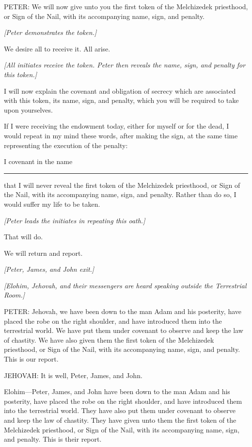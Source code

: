 				PETER: We will now give unto you the first token of the Melchizedek priesthood, or Sign of the Nail, with its accompanying name, sign, and penalty.

				\textit{[Peter demonstrates the token.]}

				We desire all to receive it. All arise.

				\textit{[All initiates receive the token. Peter then reveals the name, sign, and penalty for this token.]}

				I will now explain the covenant and obligation of secrecy which are associated with this token, its name, sign, and penalty, which you will be required to take upon yourselves.

				If I were receiving the endowment today, either for myself or for the dead, I would repeat in my mind these words, after making the sign, at the same time representing the execution of the penalty:

				I covenant in the name \rule{1cm}{0.15mm} that I will never reveal the first token of the Melchizedek priesthood, or Sign of the Nail, with its accompanying name, sign, and penalty. Rather than do so, I would suffer my life to be taken.
				
				\textit{[Peter leads the initiates in repeating this oath.]}

				That will do.

				We will return and report.

				\textit{[Peter, James, and John exit.]}
				
				\textit{[Elohim, Jehovah, and their messengers are heard speaking outside the Terrestrial Room.]}

				PETER: Jehovah, we have been down to the man Adam and his posterity, have placed the robe on the right shoulder, and have introduced them into the terrestrial world. We have put them under covenant to observe and keep the law of chastity. We have also given them the first token of the Melchizedek priesthood, or Sign of the Nail, with its accompanying name, sign, and penalty. This is our report.

				JEHOVAH: It is well, Peter, James, and John.

				Elohim---Peter, James, and John have been down to the man Adam and his posterity, have placed the robe on the right shoulder, and have introduced them into the terrestrial world. They have also put them under covenant to observe and keep the law of chastity. They have given unto them the first token of the Melchizedek priesthood, or Sign of the Nail, with its accompanying name, sign, and penalty. This is their report.

